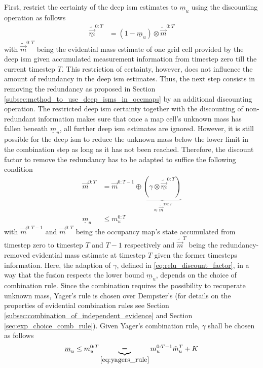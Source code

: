\\\\
First, restrict the certainty of the deep \gls{ism} estimates to $\underline{m}_u$ using the discounting operation as follows
\begin{align}
	\underline{\tilde{\vec{m}}}^{0:T} &= (1-\underline{m}_u) \otimes \tilde{\vec{m}}^{0:T}
\end{align}
with $\tilde{\vec{m}}^{0:T}$ being the evidential mass estimate of one grid cell provided by the deep \gls{ism} given accumulated measurement information from timestep zero till the current timestep $T$. This restriction of certainty, however, does not influence the amount of redundancy in the deep \gls{ism} estimates. Thus, the next step consists in removing the redundancy as proposed in Section \ref{subsec:method_to_use_deep_isms_in_occmaps} by an additional discounting operation. The restricted deep \gls{ism} certainty together with the discounting of non-redundant information makes sure that once a map cell's unknown mass has fallen beneath $\underline{m}_u$, all further deep \gls{ism} estimates are ignored. However, it is still possible for the deep \gls{ism} to reduce the unknown mass below the lower limit in the combination step as long as it has not been reached. Therefore, the discount factor to remove the redundancy has to be adapted to suffice the following condition 
\begin{align}
	\vec{m}^{0:T} &= \vec{m}^{0:T-1} \oplus \underbrace{(\gamma \otimes \underline{\tilde{\vec{m}}}^{0:T})}_{\approx \tilde{\vec{m}}^{T|0:T}}\\
	\underline{m}_u &\leq m^{0:T}_{u}
	\label{eq:lower_bound_condition}
\end{align} 
with $\vec{m}^{0:T-1}$ and $\vec{m}^{0:T}$ being the occupancy map's state accumulated from timestep zero to timestep $T$ and $T-1$ respectively and $\tilde{\vec{m}}^{T}$ being the redundancy-removed evidential mass estimate at timestep $T$ given the former timesteps information. Here, the adaption of $\gamma$, defined in \eqref{eq:relu_discount_factor}, in a way that the fusion respects the lower bound $\underline{m}_{u}$, depends on the choice of combination rule. Since the combination requires the possibility to recuperate unknown mass, Yager's rule is chosen over Dempster's (for details on the properties of evidential combination rules see Section \ref{subsec:combination_of_independent_evidence} and Section \ref{sec:exp_choice_comb_rule}). Given Yager's combination rule, $\gamma$ shall be chosen as follows
\begin{align}
	\underline{m}_u &\leq m^{0:T}_{u} \underbrace{=}_{\eqref{eq:yagers_rule}} m_{u}^{0:T-1}\tilde{m}_{u}^{T}+K \\
\end{align}
